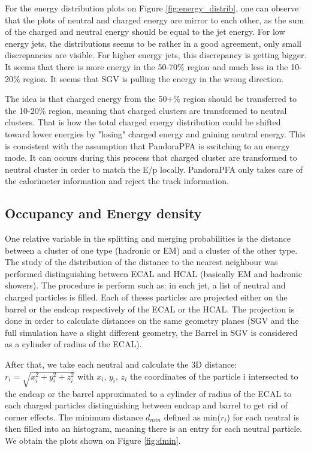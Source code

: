 \documentclass[a4paper,12pt]{article}
\begin{document}
For the energy distribution plots on Figure \ref{fig:energy_distrib}, one can observe that the plots of neutral and charged energy are mirror to each other, as the sum of the charged and neutral energy should be equal to the jet energy. For low energy jets, the distributions seems to be rather in a good agreement, only small discrepancies are visible. For higher energy jets, this discrepancy is getting bigger. It seems that there is more energy in the 50-70\% region and much less in the 10-20\% region. It seems that SGV is pulling the energy in the wrong direction.

The idea is that charged energy from the 50+\% region should be transferred to the 10-20\% region, meaning that charged clusters are transformed to neutral clusters. That is how the total charged energy distribution could be shifted toward lower energies by "losing" charged energy and gaining neutral energy. This is consistent with the assumption that PandoraPFA is switching to an energy mode. It can occurs during this process that charged cluster are transformed to neutral cluster in order to match the E/p locally. PandoraPFA only takes care of the calorimeter information and reject the track information.

\subsection{Occupancy and Energy density}

One relative variable in the splitting and merging probabilities is the distance between a cluster of one type (hadronic or EM) and a cluster of the other type. The study of the distribution of the distance to the nearest neighbour was performed distinguishing between ECAL and HCAL (basically EM and hadronic showers). The procedure is perform such as: in each jet, a list of neutral and charged particles is filled. Each of theses particles are projected either on the barrel or the endcap respectively of the ECAL or the HCAL. The projection is done in order to calculate distances on the same geometry planes (SGV and the full simulation have a slight different geometry, the Barrel in SGV is considered as a cylinder of radius of the ECAL). 

After that, we take each neutral and calculate the 3D distance: $r_i = \sqrt{x_i^2 + y_i^2 + z_i^2}$ with $x_i$, $y_i$, $z_i$ the coordinates of the particle i intersected to the endcap or the barrel approximated to a cylinder of radius of the ECAL to each charged particles distinguishing between endcap and barrel to get rid of corner effects. The minimum distance $d_{min}$ defined as min($r_i$) for each neutral is then filled into an histogram, meaning there is an entry for each neutral particle. We obtain the plots shown on Figure \ref{fig:dmin}.
\end{document}
